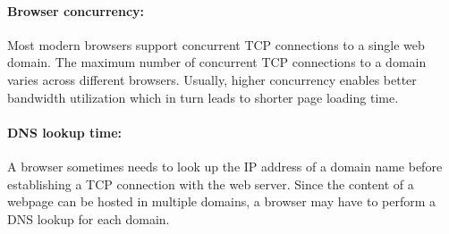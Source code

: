 

\paragraph{Browser concurrency:} Most modern browsers support concurrent 
TCP connections to a single web domain. The maximum number of concurrent 
TCP connections to a domain varies across different browsers. Usually, 
higher concurrency enables better bandwidth utilization which in turn 
leads to shorter page loading time.


\paragraph{DNS lookup time:} A browser sometimes needs to look up the IP
address of a domain name before establishing a TCP connection with the
web server. Since the content of a webpage can be hosted in multiple 
domains, a browser may have to perform a DNS lookup for each domain. 

